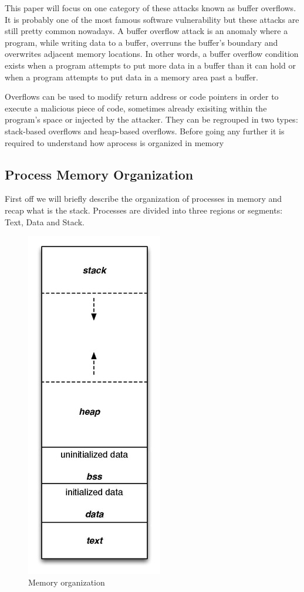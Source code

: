 \documentclass[10pt,twocolumn]{article}
\begin{document}
This paper will focus on one category of these attacks known as buffer
overflows. It is probably one of the most famous software vulnerability but
these attacks are still pretty common nowadays. A buffer overflow attack is an
anomaly where a program, while writing data to a buffer, overruns the buffer's
boundary and overwrites adjacent memory locations. In other words, a buffer
overflow condition exists when a program attempts to put more data in a buffer
than it can hold or when a program attempts to put data in a memory area past a
buffer.

Overflows can be used to modify return address or code pointers in order to
execute a malicious piece of code, sometimes already exisiting within the
program's space or injected by the attacker. They can be regrouped in two
types: stack-based overflows and heap-based overflows. Before going any further
it is required to understand how aprocess is organized in memory

\subsection{Process Memory Organization} 
First off we will briefly describe the
organization of processes in memory and recap what is the stack. Processes are
divided into three regions or segments: Text, Data and Stack.

\begin{figure}[h]
  \centering
  \includegraphics[scale=.85]{./graphics/stack_organization.jpg}
  \caption{Memory organization}
\end{figure}
\end{document}
